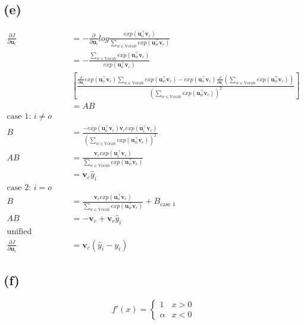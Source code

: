 \documentclass[11pt]{article}
\newcommand{\bvec}[1]{\textbf{#1}}
\begin{document}
\subsection*{(e)}
\begin{align*}
  \frac{\partial J}{\partial \bvec{u}_{i}} &= -\frac{\partial}{\partial \bvec{u}_{i}} log\frac{exp(\bvec{u}_o^{\top}\bvec{v}_c)}{\sum_{w\in \text{Vocab}}exp(\bvec{u}_w^{\top}\bvec{v}_c)}\\
    &= -\frac{\sum_{w\in \text{Vocab}}exp(\bvec{u}_w^{\top}\bvec{v}_c)}{exp(\bvec{u}_o^{\top}\bvec{v}_c)}\\
    & \left[ \frac{
      \frac{\partial}{\partial \bvec{u}_{i}}exp(\bvec{u}_o^{\top}\bvec{v}_c)\sum_{w\in \text{Vocab}}exp(\bvec{u}_w^{\top}\bvec{v}_c) - exp(\bvec{u}_o^{\top}\bvec{v}_c)\frac{\partial}{\partial \bvec{u}_{i}}(\sum_{w\in \text{Vocab}}exp(\bvec{u}_w^{\top}\bvec{v}_c))
    }{(\sum_{w\in \text{Vocab}}exp(\bvec{u}_w^{\top}\bvec{v}_c))^2} \right]\\
    &=AB \\
  \text{case 1: }i\ne o\\
  B &= \frac{-exp(\bvec{u}_o^{\top}\bvec{v}_c)\bvec{v}_c exp(\bvec{u}_i^{\top}\bvec{v}_c)}{(\sum_{w\in \text{Vocab}}exp(\bvec{u}_w^{\top}\bvec{v}_c))^2}\\
  AB &= \frac{\bvec{v}_c exp(\bvec{u}_i^{\top}\bvec{v}_c)}{\sum_{w\in \text{Vocab}}exp(\bvec{u}_w^{\top}\bvec{v}_c)}\\
    &= \bvec{v}_c \hat{y}_i\\
  \text{case 2: }i = o\\
  B &= \frac{\bvec{v}_cexp(\bvec{u}_o^{\top}\bvec{v}_c)}{\sum_{w\in \text{Vocab}}exp(\bvec{u}_w^{\top}\bvec{v}_c)} + B_{\text{case 1}}\\
  AB &= -\bvec{v}_c + \bvec{v}_c \hat{y}_i\\
  \text{unified equation}\\
  \frac{\partial J}{\partial \bvec{u}_{i}} &= \bvec{v}_c(\hat{y}_i - y_i)
\end{align*}

\subsection*{(f)}
\begin{equation*}
  f'(x) = \begin{cases}
    1 & x>0\\
    \alpha & x<0
  \end{cases}
\end{equation*}
\end{document}
